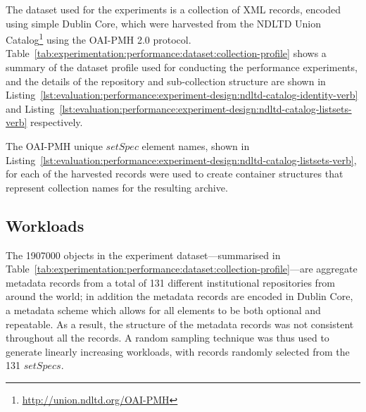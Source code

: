 \tablespacing

\bodyspacing

The dataset used for the experiments is a collection of XML records, encoded using simple Dublin Core, which were harvested from the NDLTD Union Catalog\footnote{\url{http://union.ndltd.org/OAI-PMH}} using the OAI-PMH 2.0 protocol. Table~\ref{tab:experimentation:performance:dataset:collection-profile} shows a summary of the dataset profile used for conducting the performance experiments, and the details of the repository and sub-collection structure are shown in Listing~\ref{lst:evaluation:performance:experiment-design:ndltd-catalog-identity-verb} and Listing~\ref{lst:evaluation:performance:experiment-design:ndltd-catalog-listsets-verb} respectively.

The OAI-PMH unique $setSpec$ element names, shown in Listing~\ref{lst:evaluation:performance:experiment-design:ndltd-catalog-listsets-verb}, for each of the harvested records were used to create container structures that represent collection names for the resulting archive.

\subsection{Workloads}
\label{sec:evaluation:performance:test-environment:workload-design}

The \num{1907000} objects in the experiment dataset---summarised in Table~\ref{tab:experimentation:performance:dataset:collection-profile}---are aggregate metadata records from a total of \num{131} different institutional repositories from around the world; in addition the metadata records are encoded in Dublin Core, a metadata scheme which allows for all elements to be both optional and repeatable. As a result, the structure of the metadata records was not consistent throughout all the records. A random sampling technique was thus used to generate linearly increasing workloads, with records randomly selected from the \num{131} $setSpecs$.

